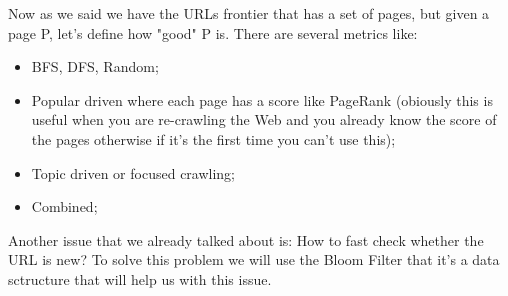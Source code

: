 Now as we said we have the URLs frontier that has a set of pages, but given a page P, let's define how "good" P is. There are several metrics like:
\begin{itemize}
    \item BFS, DFS, Random;
    \item Popular driven where each page has a score like PageRank (obiously this is useful when you are re-crawling the Web and you already know the score of the pages otherwise if it's the first time you can't use this);
    \item Topic driven or focused crawling;
    \item Combined;
\end{itemize}
Another issue that we already talked about is: How to fast check whether the URL is new? To solve this problem we will use the Bloom Filter that it's a data sctructure that will help us with this issue.\newline
